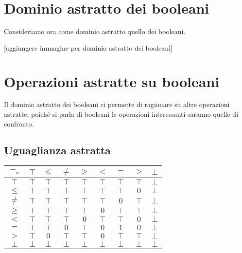 \section{Dominio astratto dei booleani}


\newcommand*{\AbBool}{\mathrm{AbBool}}

\newcommand*{\signone}{\mathord{1}}
\newcommand*{\signzero}{\mathord{0}}

Consideriamo ora come dominio astratto quello dei booleani.

[aggiungere immagine per dominio astratto dei booleani]

\section{Operazioni astratte su booleani}

Il dominio astratto dei booleani ci permette di ragionare su altre operazioni astratte; poiché si parla di booleani le operazioni interessanti saranno quelle di confronto. 

\subsection{Uguaglianza astratta}

\begin{center}
	\begin{tabular}{| c | c | c | c | c | c | c | c | c | }
		\hline
		$=_a$ & $\top$ & $\leq$ & $\neq$ & $\geq$ & $<$ & $=$ & $>$ & $\bot$ \\
		\hline
		$\top$ & $\top$ & $\top$ & $\top$ & $\top$ & $\top$ & $\top$ & $\top$ & $\bot$ \\
		\hline
		$\leq$ & $\top$ & $\top$ & $\top$ & $\top$ & $\top$ & $\top$ & $0$ & $\bot$\\
		\hline
		$\neq$ & $\top$ & $\top$ & $\top$ & $\top$ & $\top$ & $0$ & $\top$ & $\bot$\\
		\hline
		$\geq$ & $\top$ & $\top$ & $\top$ & $\top$ & $0$ & $\top$ & $\top$ & $\bot$\\
		\hline
		$<$ & $\top$ & $\top$ & $\top$ & $0$ & $\top$ & $\top$ & $0$ & $\bot$\\
		\hline
		$=$ & $\top$ & $\top$ & $0$ & $\top$ & $0$ & $1$ & $0$ & $\bot$\\
		\hline
		$>$ & $\top$ & $0$ & $\top$ & $\top$ & $0$ & $\top$ & $\top$ & $\bot$\\
		\hline
		$\bot$ & $\bot$ & $\bot$ & $\bot$ & $\bot$ & $\bot$ & $\bot$ & $\bot$ & $\bot$\\
		\hline
	\end{tabular}
\end{center}

